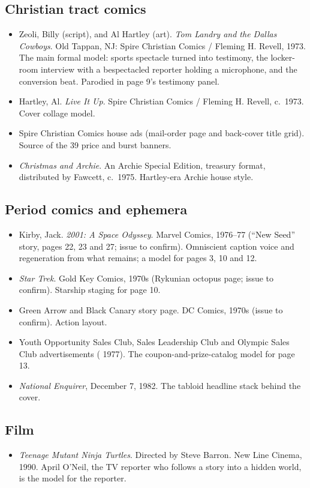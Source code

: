 \documentclass[11pt]{article}
\begin{document}
\subsection{Christian tract comics}
\begin{itemize}
\item Zeoli, Billy (script), and Al Hartley (art). \emph{Tom Landry and the Dallas Cowboys}. Old Tappan, NJ: Spire Christian Comics / Fleming H. Revell, 1973. The main formal model: sports spectacle turned into testimony, the locker-room interview with a bespectacled reporter holding a microphone, and the conversion beat. Parodied in page 9's testimony panel.
\item Hartley, Al. \emph{Live It Up}. Spire Christian Comics / Fleming H. Revell, c.~1973. Cover collage model.
\item Spire Christian Comics house ads (mail-order page and back-cover title grid). Source of the 39\textcent{} price and burst banners.
\item \emph{Christmas and Archie}. An Archie Special Edition, treasury format, distributed by Fawcett, c.~1975. Hartley-era Archie house style.
\end{itemize}

\subsection{Period comics and ephemera}
\begin{itemize}
\item Kirby, Jack. \emph{2001: A Space Odyssey}. Marvel Comics, 1976--77 (``New Seed'' story, pages 22, 23 and 27; issue to confirm). Omniscient caption voice and regeneration from what remains; a model for pages 3, 10 and 12.
\item \emph{Star Trek}. Gold Key Comics, 1970s (Rykunian octopus page; issue to confirm). Starship staging for page 10.
\item Green Arrow and Black Canary story page. DC Comics, 1970s (issue to confirm). Action layout.
\item Youth Opportunity Sales Club, Sales Leadership Club and Olympic Sales Club advertisements (\textcopyright{} 1977). The coupon-and-prize-catalog model for page 13.
\item \emph{National Enquirer}, December 7, 1982. The tabloid headline stack behind the cover.
\end{itemize}

\subsection{Film}
\begin{itemize}
\item \emph{Teenage Mutant Ninja Turtles}. Directed by Steve Barron. New Line Cinema, 1990. April O'Neil, the TV reporter who follows a story into a hidden world, is the model for the reporter.
\end{itemize}
\end{document}
